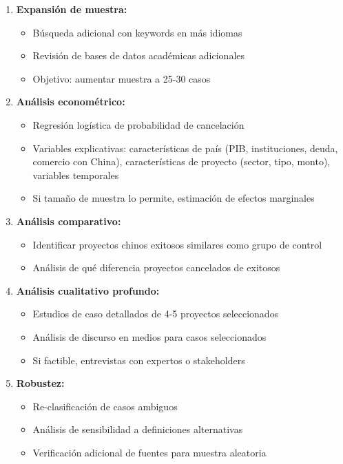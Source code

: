 \documentclass[12pt]{article}
\begin{document}
\begin{enumerate}
    \item \textbf{Expansión de muestra:}
    \begin{itemize}
        \item Búsqueda adicional con keywords en más idiomas
        \item Revisión de bases de datos académicas adicionales
        \item Objetivo: aumentar muestra a 25-30 casos
    \end{itemize}
    
    \item \textbf{Análisis econométrico:}
    \begin{itemize}
        \item Regresión logística de probabilidad de cancelación
        \item Variables explicativas: características de país (PIB, instituciones, deuda, comercio con China), características de proyecto (sector, tipo, monto), variables temporales
        \item Si tamaño de muestra lo permite, estimación de efectos marginales
    \end{itemize}
    
    \item \textbf{Análisis comparativo:}
    \begin{itemize}
        \item Identificar proyectos chinos exitosos similares como grupo de control
        \item Análisis de qué diferencia proyectos cancelados de exitosos
    \end{itemize}
    
    \item \textbf{Análisis cualitativo profundo:}
    \begin{itemize}
        \item Estudios de caso detallados de 4-5 proyectos seleccionados
        \item Análisis de discurso en medios para casos seleccionados
        \item Si factible, entrevistas con expertos o stakeholders
    \end{itemize}
    
    \item \textbf{Robustez:}
    \begin{itemize}
        \item Re-clasificación de casos ambiguos
        \item Análisis de sensibilidad a definiciones alternativas
        \item Verificación adicional de fuentes para muestra aleatoria
    \end{itemize}
\end{enumerate}
\end{document}
